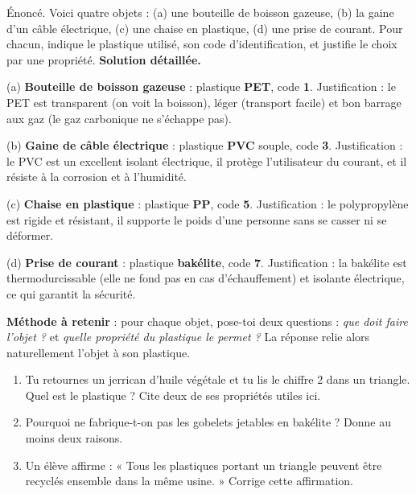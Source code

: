 \documentclass[11pt]{article}
\begin{document}
\begin{exoresolu}
Énoncé. Voici quatre objets : (a) une bouteille de boisson gazeuse, (b) la gaine d'un câble électrique, (c) une chaise en plastique, (d) une prise de courant. Pour chacun, indique le plastique utilisé, son code d'identification, et justifie le choix par une propriété.
\tcblower
\textbf{Solution détaillée.}

(a) \textbf{Bouteille de boisson gazeuse} : plastique \textbf{PET}, code \textbf{1}. Justification : le PET est transparent (on voit la boisson), léger (transport facile) et bon barrage aux gaz (le gaz carbonique ne s'échappe pas).

(b) \textbf{Gaine de câble électrique} : plastique \textbf{PVC} souple, code \textbf{3}. Justification : le PVC est un excellent isolant électrique, il protège l'utilisateur du courant, et il résiste à la corrosion et à l'humidité.

(c) \textbf{Chaise en plastique} : plastique \textbf{PP}, code \textbf{5}. Justification : le polypropylène est rigide et résistant, il supporte le poids d'une personne sans se casser ni se déformer.

(d) \textbf{Prise de courant} : plastique \textbf{bakélite}, code \textbf{7}. Justification : la bakélite est thermodurcissable (elle ne fond pas en cas d'échauffement) et isolante électrique, ce qui garantit la sécurité.

\textbf{Méthode à retenir} : pour chaque objet, pose-toi deux questions : \emph{que doit faire l'objet ?} et \emph{quelle propriété du plastique le permet ?} La réponse relie alors naturellement l'objet à son plastique.
\end{exoresolu}

\begin{exercice}
\begin{enumerate}
\item Tu retournes un jerrican d'huile végétale et tu lis le chiffre 2 dans un triangle. Quel est le plastique ? Cite deux de ses propriétés utiles ici.
\item Pourquoi ne fabrique-t-on pas les gobelets jetables en bakélite ? Donne au moins deux raisons.
\item Un élève affirme : « Tous les plastiques portant un triangle peuvent être recyclés ensemble dans la même usine. » Corrige cette affirmation.
\end{enumerate}
\end{exercice}
\end{document}
